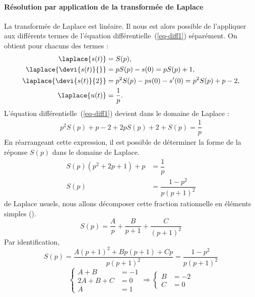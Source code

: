 \paragraph{Résolution par application de la transformée de Laplace}
La transformée de Laplace est linéaire. Il nous est alors possible
de l'appliquer aux différents termes de l'équation 
différentielle~(\ref{eq-diff1}) séparément.
On obtient pour chacuns des termes :
\begin{align*}
    \laplace{s(t)} &= S(p), \\
    \laplace{\devi{s(t)}{}} &= pS(p)-s(0) = pS(p) +1, \\
    \laplace{\devi{s(t)}{2}} &= p^2S(p)-ps(0)-s'(0) = p^2S(p) + p -2,\\
    \laplace{u(t)} &= \dfrac{1}{p}.
\end{align*}
\newpage
\restoregeometry
L'équation différentielle~(\ref{eq-diff1}) devient dans le domaine 
de Laplace :
\begin{align*}
p^2S(p)+p-2+2pS(p)+2+S(p)=\dfrac{1}{p} 
\end{align*}
En réarrangeant cette expression, il est possible de déterminer la 
forme de la réponse $S(p)$ dans le domaine de Laplace.
\begin{align*}
    S(p)\left(p^2+2p+1\right)+p&=\dfrac{1}{p} \\
    S(p)&= \dfrac{1-p^2}{p\left(p+1\right)^2}
\end{align*}
de Laplace usuels, nous allons décomposer cette
fraction rationnelle en éléments simples ().
\[
    S(p)=\dfrac{A}{p}+\dfrac{B}{p+1}+\dfrac{C}{(p+1)^2}
\]
Par identification, 
\[
    S(p)=\dfrac{A(p+1)^2+Bp(p+1)+Cp}{p(p+1)^2}
        =\dfrac{1-p^2}{p\left(p+1\right)^2}
\]
\[
\begin{cases}
    A+B&=-1 \\
    2A+B+C&=0 \\
    A&=1   
\end{cases}\Rightarrow
\begin{cases}
    B&=-2\\
    C&=0
\end{cases}
\]
